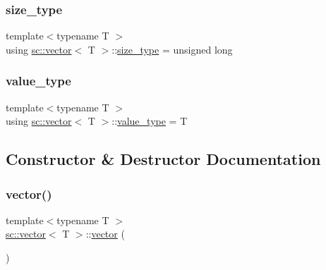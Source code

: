 \mbox{\label{classsc_1_1vector_a48bf37ba1a6d0c13504414d86e27c399}} 
\subsubsection{\texorpdfstring{size\+\_\+type}{size\_type}}
{\footnotesize\ttfamily template$<$typename T $>$ \\
using \hyperlink{classsc_1_1vector}{sc\+::vector}$<$ T $>$\+::\hyperlink{classsc_1_1vector_a48bf37ba1a6d0c13504414d86e27c399}{size\+\_\+type} =  unsigned long}

\mbox{\label{classsc_1_1vector_ad37f5bfa688e43c420ed565e4bff6fac}} 
\subsubsection{\texorpdfstring{value\+\_\+type}{value\_type}}
{\footnotesize\ttfamily template$<$typename T $>$ \\
using \hyperlink{classsc_1_1vector}{sc\+::vector}$<$ T $>$\+::\hyperlink{classsc_1_1vector_ad37f5bfa688e43c420ed565e4bff6fac}{value\+\_\+type} =  T}



\subsection{Constructor \& Destructor Documentation}
\mbox{\label{classsc_1_1vector_a8ceb2f122374a0fe1c645ebe5e759279}} 
\subsubsection{\texorpdfstring{vector()}{vector()}\hspace{0.1cm}{\footnotesize\ttfamily [1/5]}}
{\footnotesize\ttfamily template$<$typename T $>$ \\
\hyperlink{classsc_1_1vector}{sc\+::vector}$<$ T $>$\+::\hyperlink{classsc_1_1vector}{vector} (\begin{DoxyParamCaption}{ }\end{DoxyParamCaption})\hspace{0.3cm}{\ttfamily [inline]}}



